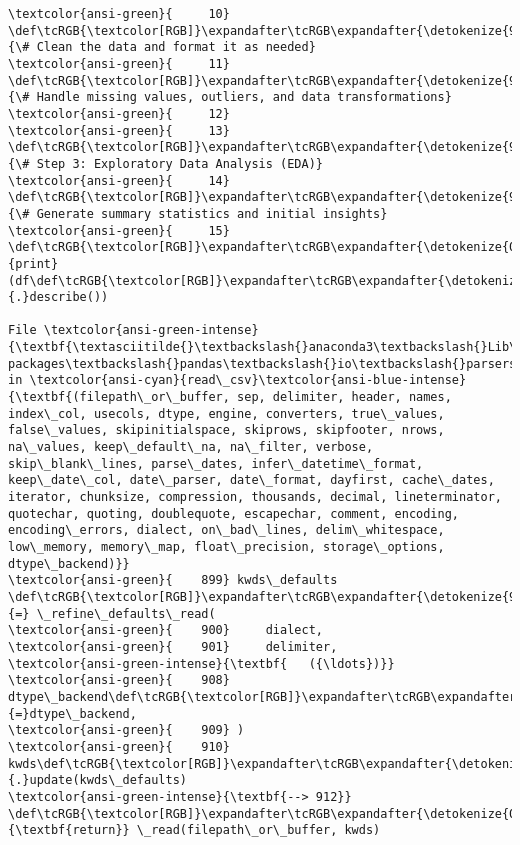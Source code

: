\documentclass[11pt]{article}
\begin{document}
\begin{Verbatim}[commandchars=\\\{\}, frame=single, framerule=2mm, rulecolor=\color{outerrorbackground}]
\textcolor{ansi-green}{     10} \def\tcRGB{\textcolor[RGB]}\expandafter\tcRGB\expandafter{\detokenize{95,135,135}}{\# Clean the data and format it as needed}
\textcolor{ansi-green}{     11} \def\tcRGB{\textcolor[RGB]}\expandafter\tcRGB\expandafter{\detokenize{95,135,135}}{\# Handle missing values, outliers, and data transformations}
\textcolor{ansi-green}{     12} 
\textcolor{ansi-green}{     13} \def\tcRGB{\textcolor[RGB]}\expandafter\tcRGB\expandafter{\detokenize{95,135,135}}{\# Step 3: Exploratory Data Analysis (EDA)}
\textcolor{ansi-green}{     14} \def\tcRGB{\textcolor[RGB]}\expandafter\tcRGB\expandafter{\detokenize{95,135,135}}{\# Generate summary statistics and initial insights}
\textcolor{ansi-green}{     15} \def\tcRGB{\textcolor[RGB]}\expandafter\tcRGB\expandafter{\detokenize{0,135,0}}{print}(df\def\tcRGB{\textcolor[RGB]}\expandafter\tcRGB\expandafter{\detokenize{98,98,98}}{.}describe())

File \textcolor{ansi-green-intense}{\textbf{\textasciitilde{}\textbackslash{}anaconda3\textbackslash{}Lib\textbackslash{}site-packages\textbackslash{}pandas\textbackslash{}io\textbackslash{}parsers\textbackslash{}readers.py:912}}, in \textcolor{ansi-cyan}{read\_csv}\textcolor{ansi-blue-intense}{\textbf{(filepath\_or\_buffer, sep, delimiter, header, names, index\_col, usecols, dtype, engine, converters, true\_values, false\_values, skipinitialspace, skiprows, skipfooter, nrows, na\_values, keep\_default\_na, na\_filter, verbose, skip\_blank\_lines, parse\_dates, infer\_datetime\_format, keep\_date\_col, date\_parser, date\_format, dayfirst, cache\_dates, iterator, chunksize, compression, thousands, decimal, lineterminator, quotechar, quoting, doublequote, escapechar, comment, encoding, encoding\_errors, dialect, on\_bad\_lines, delim\_whitespace, low\_memory, memory\_map, float\_precision, storage\_options, dtype\_backend)}}
\textcolor{ansi-green}{    899} kwds\_defaults \def\tcRGB{\textcolor[RGB]}\expandafter\tcRGB\expandafter{\detokenize{98,98,98}}{=} \_refine\_defaults\_read(
\textcolor{ansi-green}{    900}     dialect,
\textcolor{ansi-green}{    901}     delimiter,
\textcolor{ansi-green-intense}{\textbf{   ({\ldots})}}
\textcolor{ansi-green}{    908}     dtype\_backend\def\tcRGB{\textcolor[RGB]}\expandafter\tcRGB\expandafter{\detokenize{98,98,98}}{=}dtype\_backend,
\textcolor{ansi-green}{    909} )
\textcolor{ansi-green}{    910} kwds\def\tcRGB{\textcolor[RGB]}\expandafter\tcRGB\expandafter{\detokenize{98,98,98}}{.}update(kwds\_defaults)
\textcolor{ansi-green-intense}{\textbf{--> 912}} \def\tcRGB{\textcolor[RGB]}\expandafter\tcRGB\expandafter{\detokenize{0,135,0}}{\textbf{return}} \_read(filepath\_or\_buffer, kwds)


\end{Verbatim}
\end{document}
